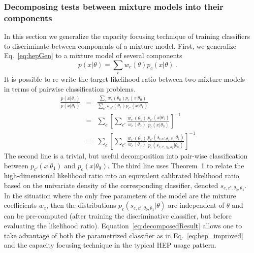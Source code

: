 \documentclass[12pt]{article}
\numberwithin{equation}{section}
\theoremstyle{plain}
\begin{document}
\subsubsection{Decomposing tests between mixture models into their components}

In this section we generalize the capacity focusing technique of training
classifiers to discriminate between components of a mixture model. First, we
generalize Eq.~\ref{eq:hepGen} to a mixture model of several components
\begin{equation}
p(x|\theta)=\sum_c w_c(\theta) p_c(x| \theta) \;.
\end{equation}
It is possible to re-write the target likelihood ratio between two mixture models in terms of pairwise classification problems.
\begin{eqnarray}\label{eq:decompose}
\frac{p(x|\theta_0)}{p(x|\theta_1)} & =& \frac{\sum_c w_c(\theta_0) p_c(x| \theta_0)}{\sum_{c'} w_{c'}(\theta_1) p_{c'}(x| \theta_1)}
\\
&=& \sum_c \left[ \sum_{c'} \frac{ w_{c'}(\theta_1)}{w_c(\theta_0)} \frac{ p_{c'}(x| \theta_1)}{  p_c(x| \theta_0)}  \right]^{-1} \\ \label{eq:decomposedResult}
&=& \sum_c \left[ \sum_{c'} \frac{ w_{c'}(\theta_1)}{w_c(\theta_0)} \frac{ p_{c'}(s_{c,c',\theta_0, \theta_1}| \theta_1)}{ p_c(s_{c,c',\theta_0, \theta_1}| \theta_0)}  \right]^{-1}
\end{eqnarray}
The second line is a trivial, but useful decomposition into pair-wise classification between $p_{c'}(x|\theta_1)$ and $p_c(x|\theta_0)$.  The third line uses Theorem~1 to relate the high-dimensional likelihood ratio into an equivalent calibrated likelihood ratio based on the univariate density of the corresponding classifier, denoted $s_{c,c',\theta_0, \theta_1}$. In the situation where the only free parameters of the  model are the mixture coefficients $w_c$, then the distributions $p_{c}(s_{c,c',\theta_0, \theta_1}| \theta)$ are independent of $\theta$ and can be pre-computed (after training the discriminative classifier, but before evaluating the  likelihood ratio). Equation~\ref{eq:decomposedResult} allows one to take advantage of both the parametrized classifier as in Eq.~\ref{eq:hep_improved} and the capacity focusing technique in the typical HEP usage pattern.
\end{document}
